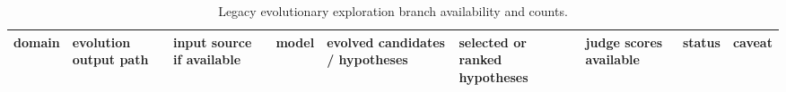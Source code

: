 \begin{table}[htbp]
\centering
\caption{Legacy evolutionary exploration branch availability and counts.}
\label{tab:evolutionary\_exploration}
\begin{tabular}{lllllllll}
\toprule
domain & evolution output path & input source if available & model & evolved candidates / hypotheses & selected or ranked hypotheses & judge scores available & status & caveat \\
\midrule
\bottomrule
\end{tabular}
\end{table}
